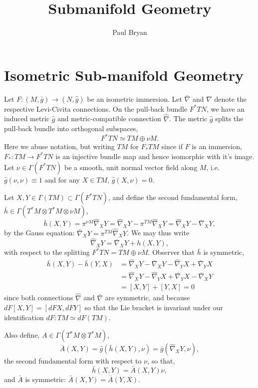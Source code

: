 \documentclass{article}
\title{Submanifold Geometry}
\author{Paul Bryan}
\begin{document}
\maketitle

\section{Isometric Sub-manifold Geometry}

Let $F: (M, \bar{g}) \to (N, \hat{g})$ be an isometric immersion. Let $\bar{\nabla}$ and $\hat{\nabla}$ denote the respective Levi-Civita connections. On the pull-back bundle $F^{\ast} TN$, we have an induced metric $\hat{g}$ and metric-compatible connection $\hat{\nabla}$. The metric $\hat{g}$ splits the  pull-back bundle into orthogonal subspaces,
\[
F^{\ast}TN \simeq TM \oplus \nu M.
\]
Here we abuse notation, but writing $TM$ for $F_{\ast} TM$ since if $F$ is an immersion, $F_{\ast} : TM \to F^{\ast} TN$ is an injective bundle map and hence isomorphic with it's image. Let $\nu \in \Gamma(F^{\ast}TN)$ be a smooth, unit normal vector field along $M$, i.e. $\hat{g}(\nu, \nu) \equiv 1$ and for any $X \in TM$, $\hat{g}(X, \nu) = 0$.

Let $X, Y \in \Gamma(TM) \subset \Gamma(F^{\ast}TN)$, and define the second fundamental form, $\bar{h} \in \Gamma(T^{\ast} M \otimes T^{\ast} M \otimes \nu M)$,
\[
\bar{h}(X, Y) = \pi^{\nu M} \hat{\nabla}_X Y = \hat{\nabla}_X Y - \pi^{TM} \hat{\nabla}_X Y = \hat{\nabla}_X Y - \bar{\nabla}_X Y,
\]
by the Gauss equation: $\bar{\nabla}_X Y = \pi^{TM} \hat{\nabla}_X Y$. We may thus write
\[
\hat{\nabla}_X Y = \bar{\nabla}_X Y + h(X, Y),
\]
with respect to the splitting $F^{\ast}TN = TM \oplus \nu M$. Observer that $\bar{h}$ is symmetric,
\[
\begin{split}
\bar{h} (X, Y) - \bar{h} (Y, X) &= \hat{\nabla}_X Y - \bar{\nabla}_X Y - \hat{\nabla}_Y X + \bar{\nabla}_Y X \\
&= \hat{\nabla}_X Y - \hat{\nabla}_Y X + \bar{\nabla}_Y X - \bar{\nabla}_X Y \\
&= [X, Y] + [Y, X] = 0
\end{split}
\]
since both connections $\hat{\nabla}$ and $\bar{\nabla}$ are symmetric, and because $dF [X, Y] = [dF X, dF Y]$ so that the Lie bracket is invariant under our identification $dF : TM \simeq dF(TM)$.

Also define, $A \in \Gamma(T^{\ast}M \otimes T^{\ast} M)$,
\[
\bar{A}(X, Y) = \hat{g}(\bar{h}(X, Y), \nu) = \bar{g} (\hat{\nabla}_X Y, \nu),
\]
the second fundamental form with respect to $\nu$, so that,
\[
\bar{h}(X, Y) = \bar{A}(X, Y) \nu,
\]
and $\bar{A}$ is symmetric: $\bar{A}(X, Y) = \bar{A}(Y, X)$.
\end{document}
